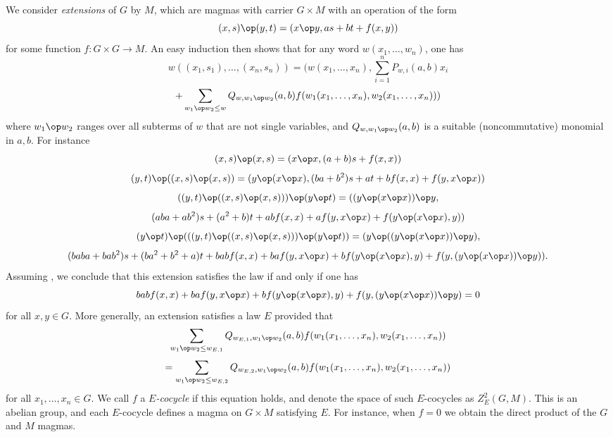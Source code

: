 We consider \emph{extensions} of $G$ by $M$, which are magmas with carrier $G \times M$ with an operation of the form
\begin{equation}\label{extension}
  (x,s) \op (y,t) = (x \op y, as + bt + f(x,y))
\end{equation}
for some function $f: G \times G \to M$.  An easy induction then shows that for any word $w(x_1,\dots,w_n)$, one has
$$ w((x_1,s_1),\dots,(x_n,s_n)) = (w(x_1,\dots,x_n), \sum_{i=1}^n P_{w,i}(a,b) x_i$$
$$ + \sum_{w_1 \op w_2 \leq w} Q_{w,w_1 \op w_2}(a,b) f(w_1(x_1,\dots,x_n), w_2(x_1,\dots,x_n)))$$
where $w_1 \op w_2$ ranges over all subterms of $w$ that are not single variables, and $Q_{w,w_1 \op w_2}(a,b)$ is a suitable (noncommutative) monomial in $a,b$.  For instance
$$ (x,s) \op (x,s) = (x \op x, (a+b) s + f(x,x))$$
$$ (y,t) \op ((x,s) \op (x,s)) = (y \op (x \op x), (ba+b^2) s + at + b f(x,x) + f(y, x \op x))$$
$$ ((y,t) \op ((x,s) \op (x,s))) \op (y \op t) = ((y \op (x \op x)) \op y,$$
$$ (aba+ab^2) s + (a^2+b)t + ab f(x,x) + a f(y, x \op x) + f(y \op (x \op x), y))$$
$$ (y \op t) \op (((y,t) \op ((x,s) \op (x,s))) \op (y \op t)) = (y \op ((y \op (x \op x)) \op y), $$
$$(baba+bab^2) s + (ba^2+b^2+a)t + bab f(x,x) + ba f(y, x \op x) + bf(y \op (x \op x), y) + f( y, (y \op (x \op x)) \op y)).$$
Assuming , we conclude that this extension satisfies the law  if and only if one has
\begin{equation}\label{cocycle-1110}
  bab f(x,x) + ba f(y, x \op x) + bf(y \op (x \op x), y) + f( y, (y \op (x \op x)) \op y) = 0
\end{equation}
for all $x,y \in G$.  More generally, an extension satisfies a law $E$ provided that
$$ \sum_{w_1 \op w_2 \leq w_{E,1}} Q_{w_{E,1},w_1 \op w_2}(a,b) f(w_1(x_1,\dots,x_n), w_2(x_1,\dots,x_n))$$
$$= \sum_{w_1 \op w_2 \leq w_{E,2}} Q_{w_{E,2},w_1 \op w_2}(a,b) f(w_1(x_1,\dots,x_n), w_2(x_1,\dots,x_n))$$
for all $x_1,\dots,x_n \in G$.  We call $f$ a \emph{$E$-cocycle} if this equation holds, and denote the space of such $E$-cocycles as $Z^2_E(G,M)$.  This is an abelian group, and each $E$-cocycle defines a magma on $G \times M$ satisfying $E$.  For instance, when $f=0$ we obtain the direct product of the $G$ and $M$ magmas.

